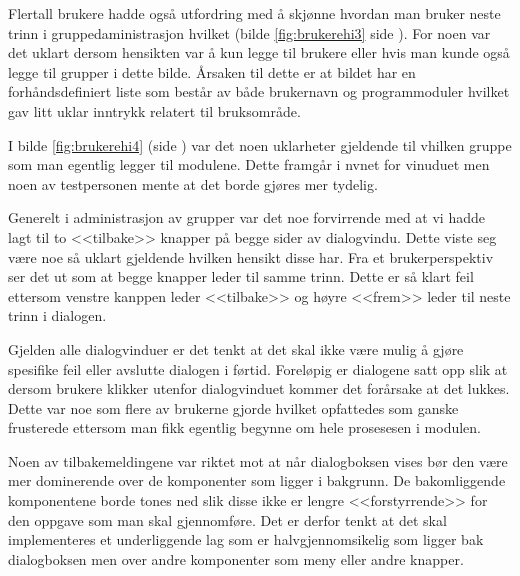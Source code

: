 Flertall brukere hadde også utfordring med å skjønne hvordan man bruker neste trinn i gruppedaministrasjon hvilket (bilde \ref{fig:brukerehi3} side \pageref{fig:brukerehi3}). For noen var det uklart dersom hensikten var å kun legge til brukere eller hvis man kunde også legge til grupper i dette bilde. Årsaken til dette er at bildet har en forhåndsdefiniert liste som består av både brukernavn og programmoduler hvilket gav litt uklar inntrykk relatert til bruksområde.

I bilde \ref{fig:brukerehi4} (side \pageref{fig:brukerehi4}) var det noen uklarheter gjeldende til vhilken gruppe som man egentlig legger til modulene. Dette framgår i nvnet for vinuduet men noen av testpersonen mente at det borde gjøres mer tydelig. 

Generelt i administrasjon av grupper var det noe forvirrende med at vi hadde lagt til to <<tilbake>> knapper på begge sider av dialogvindu. Dette viste seg være noe så uklart gjeldende hvilken hensikt disse har. Fra et brukerperspektiv ser det ut som at begge knapper leder til samme trinn. Dette er så klart feil ettersom venstre kanppen leder <<tilbake>> og høyre <<frem>> leder til neste trinn i dialogen.

Gjelden alle dialogvinduer er det tenkt at det skal ikke være mulig å gjøre spesifike feil eller avslutte dialogen i førtid. Foreløpig er dialogene satt opp slik at dersom brukere klikker utenfor dialogvinduet kommer det forårsake at det lukkes. Dette var noe som flere av brukerne gjorde hvilket opfattedes som ganske frusterede ettersom man fikk egentlig begynne om hele prosesesen i modulen.

Noen av tilbakemeldingene var riktet mot at når dialogboksen vises bør den være mer dominerende over de komponenter som ligger i bakgrunn. De bakomliggende komponentene borde tones ned slik disse ikke er lengre <<forstyrrende>> for den oppgave som man skal gjennomføre. Det er derfor tenkt at det skal implementeres et underliggende lag som er halvgjennomsikelig som ligger bak dialogboksen men over andre komponenter som meny eller andre knapper.